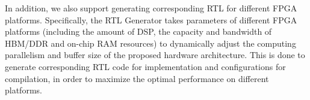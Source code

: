 In addition, we also support generating corresponding RTL for different FPGA platforms. Specifically, the RTL Generator takes parameters of different FPGA platforms (including the amount of DSP, the capacity and bandwidth of HBM/DDR and on-chip RAM resources) to dynamically adjust the computing parallelism and buffer size of the proposed hardware architecture. This is done to generate corresponding RTL code for implementation and configurations for compilation, in order to maximize the optimal performance on different platforms.

